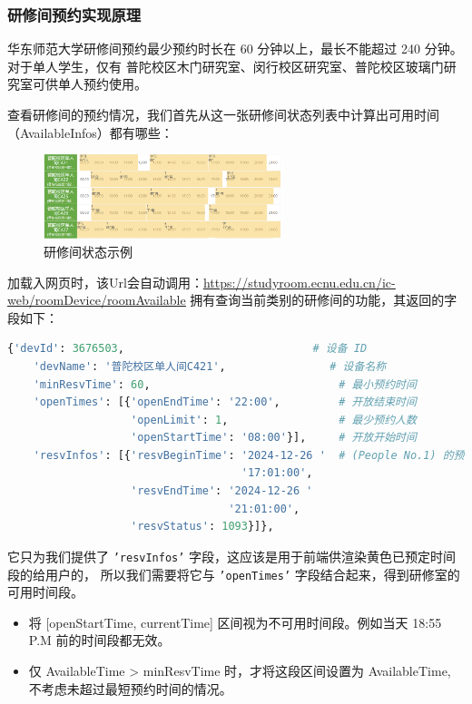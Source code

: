 \documentclass[14pt,a4paper,UTF8,twoside]{article}
\begin{document}
\subsubsection{研修间预约实现原理}

华东师范大学研修间预约最少预约时长在 60 分钟以上，最长不能超过 240 分钟。对于单人学生，仅有
普陀校区木门研究室、闵行校区研究室、普陀校区玻璃门研究室可供单人预约使用。

查看研修间的预约情况，我们首先从这一张研修间状态列表中计算出可用时间（AvailableInfos）都有哪些：

\begin{figure}[H]
    \centering
    \includegraphics[width=0.62\textwidth]{img/studyroom_state.png}
    \caption{研修间状态示例}
    \label{fig:studyroom_available}
\end{figure}

加载入网页时，该Url会自动调用：\href{https://studyroom.ecnu.edu.cn/ic-web/roomDevice/roomAvailable}{\underline{https://studyroom.ecnu.edu.cn/ic-web/roomDevice/roomAvailable}}
拥有查询当前类别的研修间的功能，其返回的字段如下：

\begin{lstlisting}[language=python]
    {'devId': 3676503,                             # 设备 ID
    'devName': '普陀校区单人间C421',                # 设备名称
    'minResvTime': 60,                             # 最小预约时间
    'openTimes': [{'openEndTime': '22:00',         # 开放结束时间
                   'openLimit': 1,                 # 最少预约人数
                   'openStartTime': '08:00'}],     # 开放开始时间
    'resvInfos': [{'resvBeginTime': '2024-12-26 '  # (People No.1) 的预约信息
                                    '17:01:00',
                   'resvEndTime': '2024-12-26 '
                                  '21:01:00',
                   'resvStatus': 1093}]},
\end{lstlisting}

它只为我们提供了 \texttt{'resvInfos'} 字段，这应该是用于前端供渲染黄色已预定时间段的给用户的，
所以我们需要将它与 \texttt{'openTimes'} 字段结合起来，得到研修室的可用时间段。

\begin{note}
    \begin{itemize}
        \item 将 [openStartTime, currentTime] 区间视为不可用时间段。例如当天 18:55 P.M 前的时间段都无效。
        \item 仅 AvailableTime > minResvTime 时，才将这段区间设置为 AvailableTime, 不考虑未超过最短预约时间的情况。
    \end{itemize}
\end{note}
\end{document}
